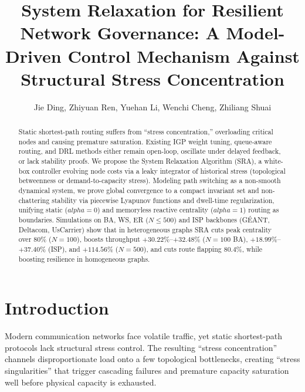 \documentclass{ccjnl}
\title{System Relaxation for Resilient Network Governance: A Model-Driven Control Mechanism Against Structural Stress Concentration}
\author{Jie Ding\inst{1}, Zhiyuan Ren\inst{2,*}, Yuehan Li\inst{2}, Wenchi Cheng\inst{2}, Zhiliang Shuai\inst{2}\corinfo{zyren@xidian.edu.cn}}
\newcommand{\rev}[1]{#1}
\def\rev#1{#1}%
\def\alpha{alpha}%
\begin{document}
\maketitle

\begin{abstract}
Static shortest-path routing suffers from ``stress concentration,'' overloading critical nodes and causing premature saturation. \rev{Existing IGP weight tuning, queue-aware routing, and DRL methods either remain open-loop, oscillate under delayed feedback, or lack stability proofs.} We propose the System Relaxation Algorithm (SRA), a white-box controller evolving node costs via a leaky integrator of historical stress \rev{(topological betweenness or demand-to-capacity stress)}. Modeling path switching as a non-smooth dynamical system, we prove \rev{global convergence to a compact invariant set} and non-chattering stability via piecewise Lyapunov functions \rev{and dwell-time regularization}, unifying static \rev{($\alpha=0$) and memoryless reactive centrality ($\alpha=1$)} routing as boundaries. Simulations on \rev{BA, WS, ER ($N \le 500$) and ISP backbones (G\'EANT, Deltacom, UsCarrier)} show that in heterogeneous graphs SRA cuts peak centrality over $80\%$ \rev{($N=100$)}, boosts throughput \rev{$+30.22\%$--$+32.48\%$ ($N=100$ BA), $+18.99\%$--$+37.40\%$ (ISP), and $+114.56\%$ ($N=500$)}, and cuts route flapping \rev{$80.4\%$}, while boosting resilience in homogeneous graphs.
\end{abstract}




\section{Introduction}
\label{sec:introduction}

Modern communication networks face volatile traffic, yet static shortest-path protocols lack structural stress control. The resulting ``stress concentration'' channels disproportionate load onto a few topological bottlenecks, creating ``stress singularities'' that trigger cascading failures and premature capacity saturation well before physical capacity is exhausted.
\end{document}
